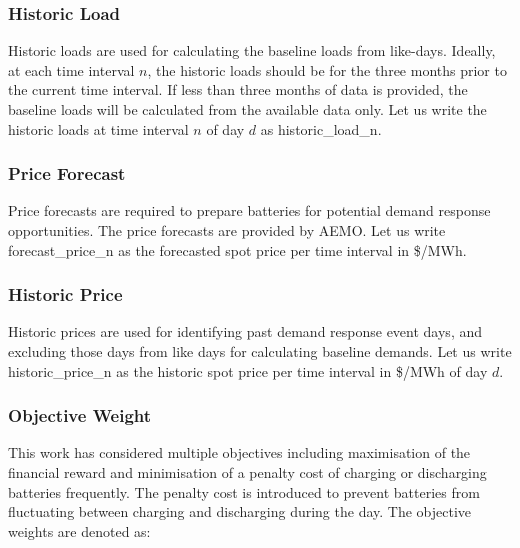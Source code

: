 
\subsubsection{Historic Load}

Historic loads are used for calculating the baseline loads from like-days. Ideally, at each time interval $n$, the historic loads should be for the three months prior to the current time interval. If less than three months of data is provided, the baseline loads will be calculated from the available data only. Let us write the historic loads at time interval $n$ of day $d$ as \gls{historic_load_n}.

\subsubsection{Price Forecast}

Price forecasts are required to prepare batteries for potential demand response opportunities. The price forecasts are provided by \gls{AEMO}. Let us write \gls{forecast_price_n} as the forecasted spot price per time interval in \$/MWh. 

\subsubsection{Historic Price}

Historic prices are used for identifying past demand response event days, and excluding those days from like days for calculating baseline demands. Let us write \gls{historic_price_n} as the historic spot price per time interval in \$/MWh of day $d$. 

\subsubsection{Objective Weight}

This work has considered multiple objectives including maximisation of the financial reward and minimisation of a penalty cost of charging or discharging batteries frequently. The penalty cost is introduced to prevent batteries from fluctuating between charging and discharging during the day. 
The objective weights are denoted as:

